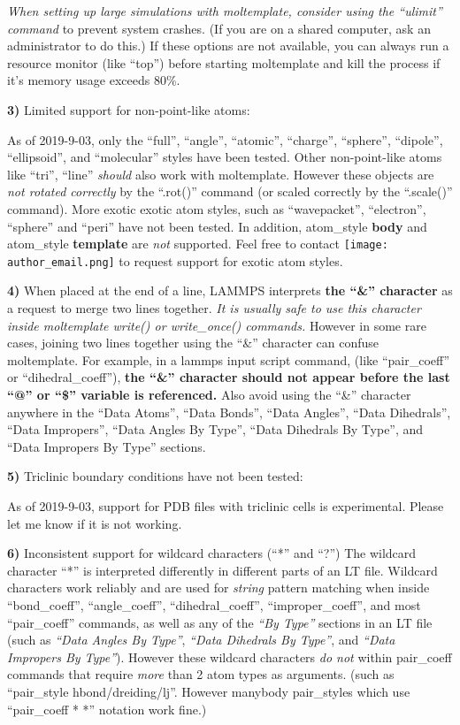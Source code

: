 \documentclass[11pt]{article}
\begin{document}
\textit{When setting up large simulations with moltemplate,
consider using the \mbox{``ulimit''} command}
to prevent system crashes.
(If you are on a shared computer, ask an administrator to do this.)
If these options are not available,
you can always run a resource monitor (like ``top'') before 
starting moltemplate and kill the process if it's memory usage exceeds 80\%.


\textbf{3)} Limited support for non-point-like atoms:

As of 2019-9-03, only the ``full'', ``angle'', ``atomic'', ``charge'',
``sphere'', ``dipole'', ``ellipsoid'', and ``molecular'' styles
have been tested.  
Other non-point-like atoms like ``tri'', ``line'' 
\textit{should} also work with moltemplate. 
However these objects
are \textit{not rotated correctly} 
by the ``.rot()'' command
(or scaled correctly by the ``.scale()'' command).
More exotic exotic atom styles, such as 
``wavepacket'', ``electron'', ``sphere'' and ``peri''
have not been tested.
In addition, atom\_style \textbf{body} and 
atom\_style \textbf{template} are \textit{not} 
supported.
Feel free to contact \texttt{[image: author\_email.png]}
to request support for exotic atom styles.


\textbf{4)} 
When placed at the end of a line, LAMMPS interprets 
\textbf{the ``\&'' character} as a 
request to merge two lines together.
\textit{It is usually safe to use this character inside
moltemplate write() or write\_once() commands.}
However in some rare cases, joining two lines together using 
the ``\&'' character can confuse moltemplate. 
For example, in a lammps input script command, 
(like ``pair\_coeff'' or ``dihedral\_coeff''), 
\textbf{the ``\&'' character should not appear before 
the last ``@'' or ``\$'' variable is referenced.}
Also avoid using the ``\&'' character anywhere in the 
``Data Atoms'', ``Data Bonds'', ``Data Angles'', ``Data Dihedrals'', ``Data Impropers'', ``Data Angles By Type'', ``Data Dihedrals By Type'', and ``Data Impropers By Type''
sections.

\textbf{5)} Triclinic boundary conditions have not been tested:

As of 2019-9-03, support for PDB files with triclinic cells is experimental.
Please let me know if it is not working.

\textbf{6)} Inconsistent support for wildcard characters (``*'' and ``?'') 
\label{sec:wildcard_bug}
   The wildcard character ``*''
   is interpreted differently in different parts of an LT file.
   Wildcard characters work reliably and are used for \textit{string}
   pattern matching when inside
   ``bond\_coeff'', ``angle\_coeff'', ``dihedral\_coeff'', ``improper\_coeff'',
   and most ``pair\_coeff'' commands,
   as well as any of the \textit{``By Type''} sections 
   in an LT file (such as
   \textit{``Data Angles By Type''}, 
   \textit{``Data Dihedrals By Type''}, and 
   \textit{``Data Impropers By Type''}).
   However these wildcard characters \textit{do not}
   within pair\_coeff commands that require \textit{more}
   than 2 atom types as arguments.
   (such as ``pair\_style hbond/dreiding/lj''.
    However manybody pair\_styles which use ``pair\_coeff * *''
    notation work fine.)
\end{document}
